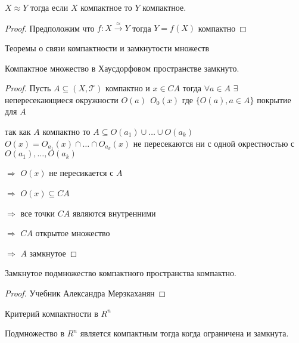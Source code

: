 \begin{block}[Следствие]
  $X \approx Y$ тогда если $X$ компактное то $Y$ компактное.
\end{block}

\begin{proof}
  Предположим что $f:X \stackrel{\approx}{\to} Y$ тогда $Y = f(X)$ компактно
\end{proof}

\begin{title}[\Large]
  Теоремы о связи компактности и замкнутости множеств
\end{title}

\begin{theorem}
  Компактное множество в Хаусдорфовом пространстве замкнуто.
\end{theorem}

\begin{proof}
  Пусть $A \subseteq (X, \mathcal{T})$ компактно и $x \in CA$ тогда
  $\forall a \in A$ $\exists$ непересекающиеся окружности $O(a) ~~ O_0(x)$ где
  $\{O(a), a \in A\}$ покрытие для $A$

  так как $A$ компактно то $A \subseteq O(a_1) \cup \ldots \cup O(a_k)$
  $O(x) = O_{a_1}(x) \cap \ldots \cap O_{a_k}(x)$ не пересекаются ни с одной
  окрестностью с $O(a_1), \ldots, O(a_k)$

  $\Rightarrow$ $O(x)$ не пересикается с $A$

  $\Rightarrow$ $O(x) \subseteq CA$

  $\Rightarrow$ все точки $CA$ являются внутренними

  $\Rightarrow$ $CA$ открытое множество

  $\Rightarrow$ $A$ замкнутое
\end{proof}

\begin{theorem}
  Замкнутое подмножество компактного пространства компактно.
\end{theorem}

\begin{proof}
  Учебник Александра Мерзкаханян
\end{proof}

\begin{title}[\Large]
  Критерий компактности в $R^n$
\end{title}

\begin{theorem}
  Подмножество в $R^n$ является компактным тогда когда ограничена и замкнута.
\end{theorem}

